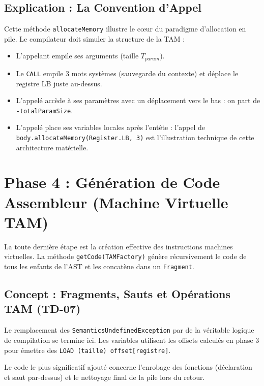 \documentclass[12pt,a4paper]{article}
\begin{document}
\subsection{Explication : La Convention d'Appel}
Cette méthode \texttt{allocateMemory} illustre le cœur du paradigme d'allocation en pile. Le compilateur doit simuler la structure de la TAM :
\begin{itemize}
    \item L'appelant empile ses arguments (taille $T_{param}$).
    \item Le \texttt{CALL} empile 3 mots systèmes (sauvegarde du contexte) et déplace le registre LB juste au-dessus.
    \item L'appelé accède à ses paramètres avec un déplacement vers le bas : on part de \texttt{-totalParamSize}.
    \item L'appelé place ses variables locales après l'entête : l'appel de \texttt{body.allocateMemory(Register.LB, 3)} est l'illustration technique de cette architecture matérielle.
\end{itemize}

\newpage
\section{Phase 4 : Génération de Code Assembleur (Machine Virtuelle TAM)}

La toute dernière étape est la création effective des instructions machines virtuelles. La méthode \texttt{getCode(TAMFactory)} génère récursivement le code de tous les enfants de l'AST et les concatène dans un \texttt{Fragment}.

\subsection{Concept : Fragments, Sauts et Opérations TAM (TD-07)}
Le remplacement des \texttt{SemanticsUndefinedException} par de la véritable logique de compilation se termine ici. Les variables utilisent les offsets calculés en phase 3 pour émettre des \texttt{LOAD (taille) offset[registre]}. 

Le code le plus significatif ajouté concerne l'enrobage des fonctions (déclaration et saut par-dessus) et le nettoyage final de la pile lors du retour.
\end{document}
